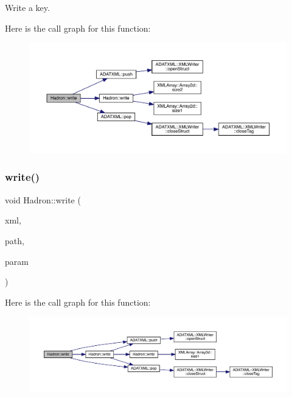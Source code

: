 Write a key. 

Here is the call graph for this function\+:
\nopagebreak
\begin{figure}[H]
\begin{center}
\leavevmode
\includegraphics[width=350pt]{d1/daf/namespaceHadron_a97758f7d26a76e70e4c61d4409eff7a6_cgraph}
\end{center}
\end{figure}
\mbox{\label{namespaceHadron_add6d43a3a15c934d9c3e98989588d22e}} 
\subsubsection{\texorpdfstring{write()}{write()}\hspace{0.1cm}{\footnotesize\ttfamily [42/95]}}
{\footnotesize\ttfamily void Hadron\+::write (\begin{DoxyParamCaption}\item[{\mbox{\hyperlink{classADATXML_1_1XMLWriter}{X\+M\+L\+Writer}} \&}]{xml,  }\item[{const std\+::string \&}]{path,  }\item[{const \mbox{\hyperlink{structHadron_1_1HadronAdjMapTarget__t}{Hadron\+Adj\+Map\+Target\+\_\+t}} \&}]{param }\end{DoxyParamCaption})}

Here is the call graph for this function\+:
\nopagebreak
\begin{figure}[H]
\begin{center}
\leavevmode
\includegraphics[width=350pt]{d1/daf/namespaceHadron_add6d43a3a15c934d9c3e98989588d22e_cgraph}
\end{center}
\end{figure}
\mbox{\label{namespaceHadron_a4c0a824fa457c4fbaac034c83f5554c5}} 
